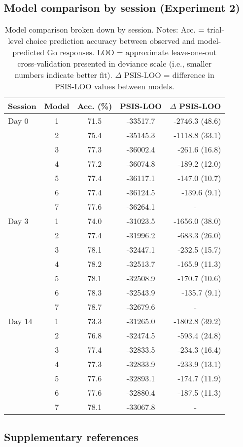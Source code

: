 \documentclass[a4paper,12pt]{article}
\begin{document}
\begin{refsection}[supp]
\clearpage
\subsection*{Model comparison by session (Experiment 2)}

\begin{table}[h]
    \centering
    \begin{tabular}{lcccr}
        \toprule
        Session & Model & Acc. (\%) & PSIS-LOO & \multicolumn{1}{c}{$\Delta$ PSIS-LOO} \\
        \midrule
         Day 0 & 1 & 71.5 & -33517.7 & -2746.3 (48.6) \\
         & 2 & 75.4 & -35145.3 & -1118.8 (33.1) \\
         & 3 & 77.3 & -36002.4 & -261.6 (16.8) \\
         & 4 & 77.2 & -36074.8 & -189.2 (12.0) \\
         & 5 & 77.4 & -36117.1 & -147.0 (10.7) \\
         & 6 & 77.4 & -36124.5 & -139.6 (9.1) \\
         & 7 & 77.6 & -36264.1 & \multicolumn{1}{c}{-} \\
         \midrule
         Day 3 & 1 & 74.0 & -31023.5 & -1656.0 (38.0) \\
         & 2 & 77.4 & -31996.2 & -683.3 (26.0) \\
         & 3 & 78.1 & -32447.1 & -232.5 (15.7) \\
         & 4 & 78.2 & -32513.7 & -165.9 (11.3) \\
         & 5 & 78.1 & -32508.9 & -170.7 (10.6) \\
         & 6 & 78.3 & -32543.9 & -135.7 (9.1) \\
         & 7 & 78.7 & -32679.6 & \multicolumn{1}{c}{-} \\
         \midrule
         Day 14 & 1 & 73.3 & -31265.0 & -1802.8 (39.2) \\
         & 2 & 76.8 & -32474.5 & -593.4 (24.8) \\
         & 3 & 77.4 & -32833.5 & -234.3 (16.4) \\
         & 4 & 77.3 & -32833.9 & -233.9 (13.1) \\
         & 5 & 77.6 & -32893.1 & -174.7 (11.9) \\
         & 6 & 77.6 & -32880.4 & -187.5 (11.3) \\
         & 7 & 78.1 & -33067.8 & \multicolumn{1}{c}{-} \\
         \bottomrule
    \end{tabular}
    \caption{Model comparison broken down by session. Notes: Acc. = trial-level choice prediction accuracy between observed and model-predicted Go responses. LOO = approximate leave-one-out cross-validation presented in deviance scale (i.e., smaller numbers indicate better fit). \break $\Delta$ PSIS-LOO = difference in PSIS-LOO values between models.}
    \label{tab:exp2_mc_full}
\end{table}

\break
\subsection*{Supplementary references}
\printbibliography[heading=supp]
\end{refsection}

\end{document}
